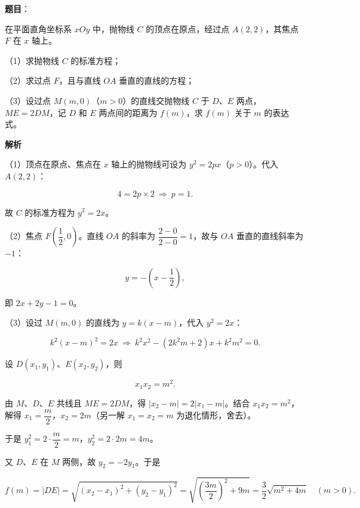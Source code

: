 \begin{answer}

\textbf{题目}：

在平面直角坐标系 $xOy$ 中，抛物线 $C$ 的顶点在原点，经过点 $A(2,2)$，其焦点 $F$ 在 $x$ 轴上。

（1）求抛物线 $C$ 的标准方程；

（2）求过点 $F$，且与直线 $OA$ 垂直的直线的方程；

（3）设过点 $M(m,0)$（$m>0$）的直线交抛物线 $C$ 于 $D$、$E$ 两点，$ME=2DM$，记 $D$ 和 $E$ 两点间的距离为 $f(m)$，求 $f(m)$ 关于 $m$ 的表达式。
\nopagebreak[4]
\begin{center}\end{center}
\nopagebreak[4]
\textbf{解析}

（1）顶点在原点、焦点在 $x$ 轴上的抛物线可设为 $y^2=2px$（$p>0$）。代入 $A(2,2)$：

\nopagebreak[4]
\[4=2p\times2\ \Longrightarrow\ p=1 .\]

故 $C$ 的标准方程为 $y^2=2x$。

（2）焦点 $F\left(\dfrac12,0\right)$。直线 $OA$ 的斜率为 $\dfrac{2-0}{2-0}=1$，故与 $OA$ 垂直的直线斜率为 $-1$：

\nopagebreak[4]
\[y=-\left(x-\frac12\right),\]

即 $2x+2y-1=0$。

（3）设过 $M(m,0)$ 的直线为 $y=k(x-m)$，代入 $y^2=2x$：

\nopagebreak[4]
\[k^2(x-m)^2=2x\ \Longrightarrow\ k^2x^2-(2k^2m+2)x+k^2m^2=0 .\]

设 $D(x_1,y_1)$、$E(x_2,y_2)$，则

\nopagebreak[4]
\[x_1x_2=m^2 .\]

由 $M$、$D$、$E$ 共线且 $ME=2DM$，得 $|x_2-m|=2|x_1-m|$。结合 $x_1x_2=m^2$，解得 $x_1=\dfrac m2$，$x_2=2m$（另一解 $x_1=x_2=m$ 为退化情形，舍去）。

于是 $y_1^2=2\cdot\dfrac m2=m$，$y_2^2=2\cdot2m=4m$。

又 $D$、$E$ 在 $M$ 两侧，故 $y_2=-2y_1$。于是

\nopagebreak[4]
\[f(m)=|DE|=\sqrt{(x_2-x_1)^2+(y_2-y_1)^2}=\sqrt{\left(\frac{3m}2\right)^2+9m}=\frac32\sqrt{m^2+4m}\quad(m>0).\]


\end{answer}
